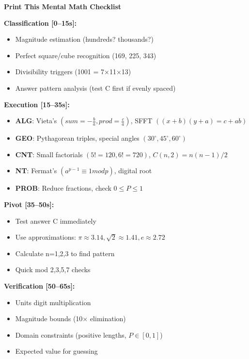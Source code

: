 \documentclass{article}
\begin{document}
\begin{tcolorbox}[colback=green!5!white,colframe=green!75!black,title={\textbf{QUICK REFERENCE: Mental Math by Timeline Phase}}]
\begin{center}
\textbf{Print This Mental Math Checklist}
\end{center}
\vspace{2mm}
\textbf{Classification [0--15s]:}
\begin{itemize}[nosep]
\item Magnitude estimation (hundreds? thousands?)
\item Perfect square/cube recognition (169, 225, 343)
\item Divisibility triggers (1001 = 7×11×13)
\item Answer pattern analysis (test C first if evenly spaced)
\end{itemize}

\textbf{Execution [15--35s]:}
\begin{itemize}[nosep]
\item \textbf{ALG}: Vieta's $(sum=-\frac{b}{a}, prod=\frac{c}{a})$, SFFT $((x+b)(y+a)=c+ab)$
\item \textbf{GEO}: Pythagorean triples, special angles $(30^\circ,45^\circ,60^\circ)$
\item \textbf{CNT}: Small factorials $(5!=120, 6!=720)$, $C(n,2)=n(n-1)/2$
\item \textbf{NT}: Fermat's $(a^{p-1}\equiv1 mod p)$, digital root
\item \textbf{PROB}: Reduce fractions, check $0\leq P\leq1$
\end{itemize}

\textbf{Pivot [35--50s]:}
\begin{itemize}[nosep]
\item Test answer C immediately
\item Use approximations: $\pi \approx 3.14, \sqrt{2} \approx 1.41, e \approx 2.72$
\item Calculate n=1,2,3 to find pattern
\item Quick mod 2,3,5,7 checks
\end{itemize}

\textbf{Verification [50--65s]:}
\begin{itemize}[nosep]
\item Units digit multiplication
\item Magnitude bounds (10× elimination)
\item Domain constraints (positive lengths, $P\in[0,1]$)
\item Expected value for guessing
\end{itemize}


\end{tcolorbox}
\end{document}
